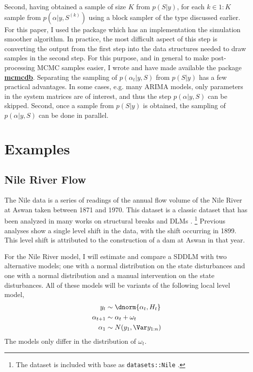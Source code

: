 Second, having obtained a sample of size $K$ from $p(S | y)$, for each $k \in 1:K$ sample from $p(\alpha | y, S^{(k)})$ using a block sampler of the type discussed earlier.
For this paper, I used the \RLang{} package  \parencite{Helske2012} which has an implementation the \textcite{DurbinKoopman2002} simulation smoother algorithm.
In practice, the most difficult aspect of this step is converting the output from the first step into the data structures needed to draw samples in the second step.
For this purpose, and in general to make post-processing MCMC samples easier, I wrote and have made available the \RLang{} package \href{https://github.com/jrnold/mcmcdb}{\textbf{mcmcdb}}.
Separating the sampling of $p(\alpha_{t} | y, S)$ from $p(S | y)$ has a few practical advantages.
In some cases, e.g. many ARIMA models, only parameters in the system matrices are of interest, and thus the step $p(\alpha | y, S)$ can be skipped.
Second, once a sample from $p(S | y)$ is obtained, the sampling of $p(\alpha | y, S)$ can be done in parallel.


\section{Examples}
\label{dlm:sec:examples}

\subsection{Nile River Flow}
\label{dlm:sec:nile}

The Nile data is a series of readings of the annual flow volume of the Nile River at Aswan taken between 1871 and 1970.
This dataset is a classic dataset that has been analyzed in many works on structural breaks and DLMs \parencites{Cobb1978}{Balke1993}{JongPenzer1998}{DurbinKoopman2001}{CommandeurKoopmanOoms2011}.%
\footnote{The dataset is included with base \RLang{} as \texttt{datasets::Nile} \parencite{RCT2013}.}
Previous analyses show a single level shift in the data, with the shift occurring in 1899.
This level shift is attributed to the construction of a dam at Aswan in that year.

For the Nile River model, I will estimate and compare a SDDLM with two alternative models; one with a normal distribution on the state disturbances and one with a normal distribution and a manual intervention on the state disturbances.
All of these models will be variants of the following local level model,
\begin{equation}
  \label{dlm:eq:21}
  \begin{aligned}[t]
    y_{t} &\sim \dnorm{\alpha_{t}, H_{t}} \\
    \alpha_{t + 1} &\sim \alpha_{t} + \omega_{t} \\
    \alpha_{1} &\sim N(y_{1}, \Var y_{1:n})
  \end{aligned}
\end{equation}
The models only differ in the distribution of $\omega_{t}$.

